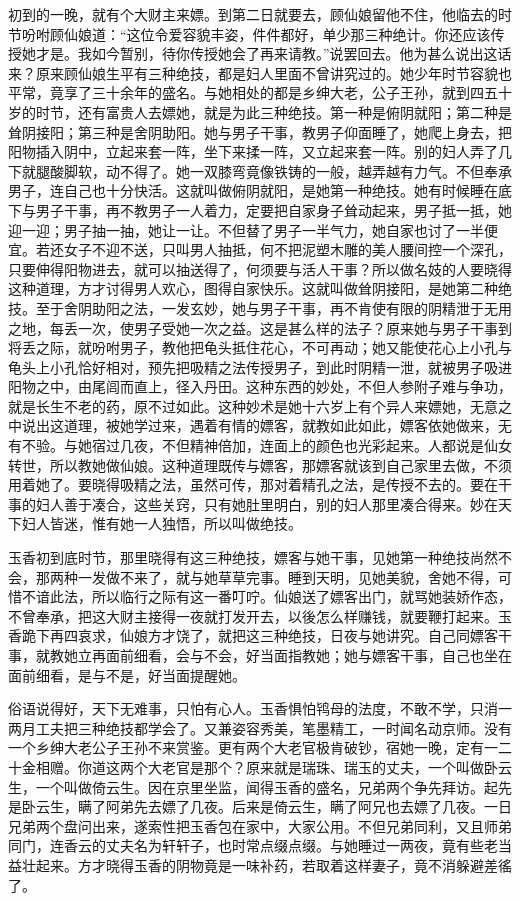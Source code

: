 \documentclass[a4paper,12pt,UTF8,twoside]{ctexbook}
\begin{document}
初到的一晚，就有个大财主来嫖。到第二日就要去，顾仙娘留他不住，他临去的时节吩咐顾仙娘道：“这位令爱容貌丰姿，件件都好，单少那三种绝计。你还应该传授她才是。我如今暂别，待你传授她会了再来请教。”说罢回去。他为甚么说出这话来？原来顾仙娘生平有三种绝技，都是妇人里面不曾讲究过的。她少年时节容貌也平常，竟享了三十余年的盛名。与她相处的都是乡绅大老，公子王孙，就到四五十岁的时节，还有富贵人去嫖她，就是为此三种绝技。第一种是俯阴就阳；第二种是耸阴接阳；第三种是舍阴助阳。她与男子干事，教男子仰面睡了，她爬上身去，把阳物插入阴中，立起来套一阵，坐下来揉一阵，又立起来套一阵。别的妇人弄了几下就腿酸脚软，动不得了。她一双膝弯竟像铁铸的一般，越弄越有力气。不但奉承男子，连自己也十分快活。这就叫做俯阴就阳，是她第一种绝技。她有时候睡在底下与男子干事，再不教男子一人着力，定要把自家身子耸动起来，男子抵一抵，她迎一迎；男子抽一抽，她让一让。不但替了男子一半气力，她自家也讨了一半便宜。若还女子不迎不送，只叫男人抽抵，何不把泥塑木雕的美人腰间控一个深孔，只要伸得阳物进去，就可以抽送得了，何须要与活人干事？所以做名妓的人要晓得这种道理，方才讨得男人欢心，图得自家快乐。这就叫做耸阴接阳，是她第二种绝技。至于舍阴助阳之法，一发玄妙，她与男子干事，再不肯使有限的阴精泄于无用之地，每丢一次，使男子受她一次之益。这是甚么样的法子？原来她与男子干事到将丢之际，就吩咐男子，教他把龟头抵住花心，不可再动；她又能使花心上小孔与龟头上小孔恰好相对，预先把吸精之法传授男子，到此时阴精一泄，就被男子吸进阳物之中，由尾闾而直上，径入丹田。这种东西的妙处，不但人参附子难与争功，就是长生不老的药，原不过如此。这种妙术是她十六岁上有个异人来嫖她，无意之中说出这道理，被她学过来，遇着有情的嫖客，就教如此如此，嫖客依她做来，无有不验。与她宿过几夜，不但精神倍加，连面上的颜色也光彩起来。人都说是仙女转世，所以教她做仙娘。这种道理既传与嫖客，那嫖客就该到自己家里去做，不须用着她了。要晓得吸精之法，虽然可传，那对着精孔之法，是传授不去的。要在干事的妇人善于凑合，这些关窍，只有她肚里明白，别的妇人那里凑合得来。妙在天下妇人皆迷，惟有她一人独悟，所以叫做绝技。

玉香初到底时节，那里晓得有这三种绝技，嫖客与她干事，见她第一种绝技尚然不会，那两种一发做不来了，就与她草草完事。睡到天明，见她美貌，舍她不得，可惜不谙此法，所以临行之际有这一番叮咛。仙娘送了嫖客出门，就骂她装娇作态，不曾奉承，把这大财主接得一夜就打发开去，以後怎么样赚钱，就要鞭打起来。玉香跪下再四哀求，仙娘方才饶了，就把这三种绝技，日夜与她讲究。自己同嫖客干事，就教她立再面前细看，会与不会，好当面指教她；她与嫖客干事，自己也坐在面前细看，是与不是，好当面提醒她。

俗语说得好，天下无难事，只怕有心人。玉香惧怕鸨母的法度，不敢不学，只消一两月工夫把三种绝技都学会了。又兼姿容秀美，笔墨精工，一时闻名动京师。没有一个乡绅大老公子王孙不来赏鉴。更有两个大老官极肯破钞，宿她一晚，定有一二十金相赠。你道这两个大老官是那个？原来就是瑞珠、瑞玉的丈夫，一个叫做卧云生，一个叫做倚云生。因在京里坐监，闻得玉香的盛名，兄弟两个争先拜访。起先是卧云生，瞒了阿弟先去嫖了几夜。后来是倚云生，瞒了阿兄也去嫖了几夜。一日兄弟两个盘问出来，遂索性把玉香包在家中，大家公用。不但兄弟同利，又且师弟同门，连香云的丈夫名为轩轩子，也时常点缀点缀。与她睡过一两夜，竟有些老当益壮起来。方才晓得玉香的阴物竟是一味补药，若取着这样妻子，竟不消躲避差徭了。
\end{document}
